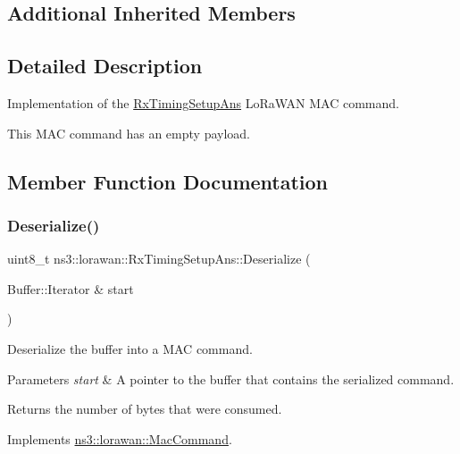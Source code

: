 \subsection*{Additional Inherited Members}


\subsection{Detailed Description}
Implementation of the \hyperlink{classns3_1_1lorawan_1_1RxTimingSetupAns}{Rx\+Timing\+Setup\+Ans} Lo\+Ra\+W\+AN M\+AC command.

This M\+AC command has an empty payload. 

\subsection{Member Function Documentation}
\mbox{\label{classns3_1_1lorawan_1_1RxTimingSetupAns_afe32bdb5e12970affb01835f692c96c4}} 
\subsubsection{\texorpdfstring{Deserialize()}{Deserialize()}}
{\footnotesize\ttfamily uint8\+\_\+t ns3\+::lorawan\+::\+Rx\+Timing\+Setup\+Ans\+::\+Deserialize (\begin{DoxyParamCaption}\item[{Buffer\+::\+Iterator \&}]{start }\end{DoxyParamCaption})\hspace{0.3cm}{\ttfamily [virtual]}}

Deserialize the buffer into a M\+AC command.


\begin{DoxyParams}{Parameters}
{\em start} & A pointer to the buffer that contains the serialized command. \\
\hline
\end{DoxyParams}
\begin{DoxyReturn}{Returns}
the number of bytes that were consumed. 
\end{DoxyReturn}


Implements \hyperlink{classns3_1_1lorawan_1_1MacCommand_af12d223a71a67196bce498f1240eda75}{ns3\+::lorawan\+::\+Mac\+Command}.

